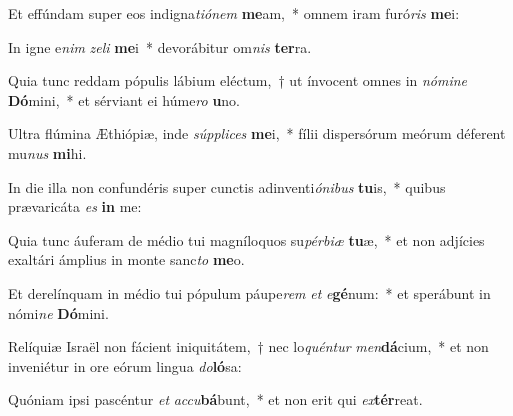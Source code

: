 \item Et effúndam super eos indigna\textit{ti}\textit{ó}\textit{nem} \textbf{me}am,~* omnem iram furó\textit{ris} \textbf{me}i:
\item In igne e\textit{nim} \textit{ze}\textit{li} \textbf{me}i~* devorábitur om\textit{nis} \textbf{ter}ra.
\item Quia tunc reddam pópulis lábium eléctum,~† ut ínvocent omnes in \textit{nó}\textit{mi}\textit{ne} \textbf{Dó}mini,~* et sérviant ei húme\textit{ro} \textbf{u}no.
\item Ultra flúmina Æthiópiæ, inde \textit{súp}\textit{pli}\textit{ces} \textbf{me}i,~* fílii dispersórum meórum déferent mu\textit{nus} \textbf{mi}hi.
\item In die illa non confundéris super cunctis adinventi\textit{ó}\textit{ni}\textit{bus} \textbf{tu}is,~* quibus prævaricáta \textit{es} \textbf{in} me:
\item Quia tunc áuferam de médio tui magníloquos su\textit{pér}\textit{bi}\textit{æ} \textbf{tu}æ,~* et non adjícies exaltári ámplius in monte sanc\textit{to} \textbf{me}o.
\item Et derelínquam in médio tui pópulum páupe\textit{rem} \textit{et} \textit{e}\textbf{gé}num:~* et sperábunt in nómi\textit{ne} \textbf{Dó}mini.
\item Relíquiæ Israël non fácient iniquitátem,~† nec lo\textit{quén}\textit{tur} \textit{men}\textbf{dá}cium,~* et non inveniétur in ore eórum lingua \textit{do}\textbf{ló}sa:
\item Quóniam ipsi pascéntur \textit{et} \textit{ac}\textit{cu}\textbf{bá}bunt,~* et non erit qui \textit{ex}\textbf{tér}reat.
